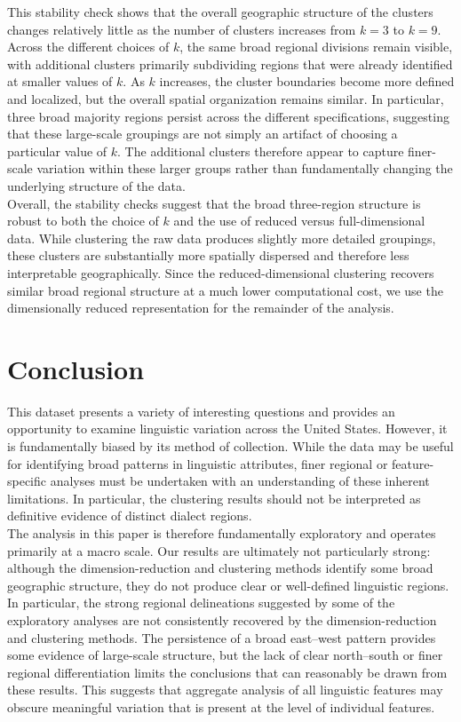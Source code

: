 \documentclass[10pt,letterpaper]{article}
\begin{document}
This stability check shows that the overall geographic structure of the clusters changes relatively little as the number of clusters increases from $k=3$ to $k=9$. Across the different choices of $k$, the same broad regional divisions remain visible, with additional clusters primarily subdividing regions that were already identified at smaller values of $k$. As $k$ increases, the cluster boundaries become more defined and localized, but the overall spatial organization remains similar. In particular, three broad majority regions persist across the different specifications, suggesting that these large-scale groupings are not simply an artifact of choosing a particular value of $k$. The additional clusters therefore appear to capture finer-scale variation within these larger groups rather than fundamentally changing the underlying structure of the data.\\

Overall, the stability checks suggest that the broad three-region structure is robust to both the choice of \(k\) and the use of reduced versus full-dimensional data. While clustering the raw data produces slightly more detailed groupings, these clusters are substantially more spatially dispersed and therefore less interpretable geographically. Since the reduced-dimensional clustering recovers similar broad regional structure at a much lower computational cost, we use the dimensionally reduced representation for the remainder of the analysis.


\section{Conclusion}\label{conclusion}
This dataset presents a variety of interesting questions and provides an opportunity to examine linguistic variation across the United States. However, it is fundamentally biased by its method of collection. While the data may be useful for identifying broad patterns in linguistic attributes, finer regional or feature-specific analyses must be undertaken with an understanding of these inherent limitations. In particular, the clustering results should not be interpreted as definitive evidence of distinct dialect regions.\\

The analysis in this paper is therefore fundamentally exploratory and operates primarily at a macro scale. Our results are ultimately not particularly strong: although the dimension-reduction and clustering methods identify some broad geographic structure, they do not produce clear or well-defined linguistic regions. In particular, the strong regional delineations suggested by some of the exploratory analyses are not consistently recovered by the dimension-reduction and clustering methods. The persistence of a broad east--west pattern provides some evidence of large-scale structure, but the lack of clear north--south or finer regional differentiation limits the conclusions that can reasonably be drawn from these results. This suggests that aggregate analysis of all linguistic features may obscure meaningful variation that is present at the level of individual features.\\
\end{document}
